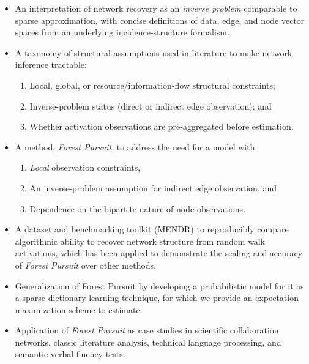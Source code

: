 \documentclass[%
	12pt,
		oneside,
		letterpaper
]{book}
\providecommand{\tightlist}{%
  \setlength{\itemsep}{0pt}\setlength{\parskip}{0pt}}\usepackage{longtable,booktabs,array}
\begin{document}
\begin{itemize}
\tightlist
\item
  An interpretation of network recovery as an \emph{inverse problem}
  comparable to sparse approximation, with concise definitions of data,
  edge, and node vector spaces from an underlying incidence-structure
  formalism.
\item
  A taxonomy of structural assumptions used in literature to make
  network inference tractable:

  \begin{enumerate}
  \def\labelenumi{\arabic{enumi})}
  \tightlist
  \item
    Local, global, or resource/information-flow structural constraints;
  \item
    Inverse-problem status (direct or indirect edge observation); and
  \item
    Whether activation observations are pre-aggregated before
    estimation.
  \end{enumerate}
\item
  A method, \emph{Forest Pursuit}, to address the need for a model with:

  \begin{enumerate}
  \def\labelenumi{\arabic{enumi})}
  \tightlist
  \item
    \emph{Local} observation constraints,
  \item
    An inverse-problem assumption for indirect edge observation, and
  \item
    Dependence on the bipartite nature of node observations.\\
  \end{enumerate}
\item
  A dataset and benchmarking toolkit (MENDR) to reproducibly compare
  algorithmic ability to recover network structure from random walk
  activations, which has been applied to demonstrate the scaling and
  accuracy of \emph{Forest Pursuit} over other methods.
\item
  Generalization of Forest Pursuit by developing a probabilistic model
  for it as a sparse dictionary learning technique, for which we provide
  an expectation maximization scheme to estimate.\\
\item
  Application of \emph{Forest Pursuit} as case studies in scientific
  collaboration networks, classic literature analysis, technical
  language processing, and semantic verbal fluency tests.
\end{itemize}
\end{document}
